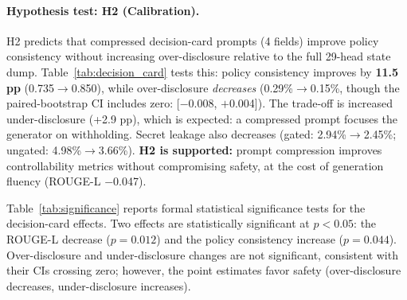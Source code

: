 \documentclass[11pt]{article}
\begin{document}
\paragraph{Hypothesis test: H2 (Calibration).}
H2 predicts that compressed decision-card prompts (4 fields) improve policy consistency without increasing over-disclosure relative to the full 29-head state dump. Table~\ref{tab:decision_card} tests this: policy consistency improves by \textbf{11.5 pp} (0.735$\to$0.850), while over-disclosure \textit{decreases} (0.29\%$\to$0.15\%, though the paired-bootstrap CI includes zero: [$-$0.008, $+$0.004]). The trade-off is increased under-disclosure (+2.9 pp), which is expected: a compressed prompt focuses the generator on withholding. Secret leakage also decreases (gated: 2.94\%$\to$2.45\%; ungated: 4.98\%$\to$3.66\%). \textbf{H2 is supported:} prompt compression improves controllability metrics without compromising safety, at the cost of generation fluency (ROUGE-L $-$0.047).

Table~\ref{tab:significance} reports formal statistical significance tests for the decision-card effects. Two effects are statistically significant at $p{<}0.05$: the ROUGE-L decrease ($p{=}0.012$) and the policy consistency increase ($p{=}0.044$). Over-disclosure and under-disclosure changes are not significant, consistent with their CIs crossing zero; however, the point estimates favor safety (over-disclosure decreases, under-disclosure increases).

\begin{table}[t]
\centering
\caption{Statistical significance of decision-card effects (bootstrap $n{=}1{,}000$). $^*p{<}0.05$, $^{**}p{<}0.01$, $^{***}p{<}0.001$, ns = not significant.}
\label{tab:significance}
\small
{}
\end{table}
\end{document}
